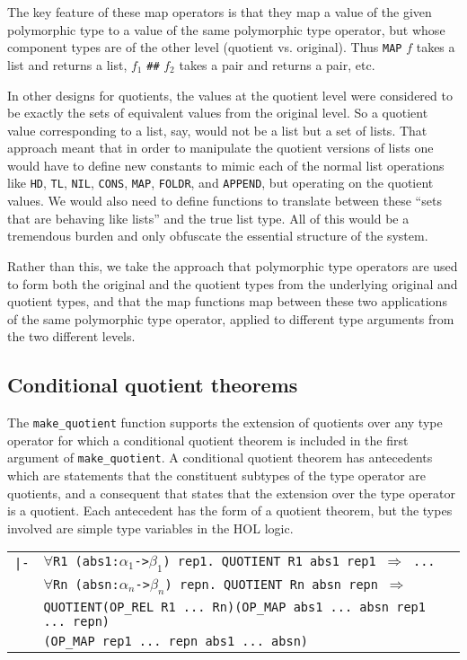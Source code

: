 \documentclass[envcountsame,runningheads]{llncs}
\begin{document}
The key feature of these map operators is that they map a value of the
given polymorphic type to a value of the same polymorphic type operator,
but whose component types are of the other level (quotient vs. original).
Thus {\tt MAP} $f$ takes a list and returns a list, $f_1$ {\tt \#\#} $f_2$
takes a pair and returns a pair, etc. 

In other designs for quotients, the values at the quotient level
were considered to be exactly the sets of equivalent values from
the original level.  So a quotient value corresponding to a list, say, 
would not be a list but a set of lists.  That approach meant that
in order to manipulate the quotient versions of lists one would have to
define new constants to mimic each of the normal list operations like
{\tt HD}, {\tt TL}, {\tt NIL}, {\tt CONS}, {\tt MAP}, {\tt FOLDR}, and {\tt APPEND},
but operating on the quotient values.
We would also need to define functions to translate between these
``sets that are behaving like lists'' and the true list type. 
All of this
would be a tremendous burden and only obfuscate the essential
structure of the system. 

Rather than this, we take the approach
that polymorphic type operators are used to form both the original and
the quotient types from the underlying original and quotient types,
and that the map functions map between these two applications of the
same polymorphic type operator, applied to different type arguments from the
two different levels.

%
\subsection{Conditional quotient theorems}
%
\label{condquotients}

The
{\tt make\_quotient}
function supports the extension of quotients
over any type operator for which a conditional quotient theorem is 
included in the first argument of {\tt make\_quotient}.
A conditional quotient theorem
has antecedents
which are statements
that the constituent subtypes
of the type operator are quotients, and a consequent that states that the 
extension over the type operator is a quotient.
Each antecedent has the form of a quotient theorem, but the types involved
are simple type variables in the HOL logic.
\begin{center}
\begin{tabular}{rl}
{\tt |-}
& {\tt $\forall$R1 (abs1:$\alpha_1$->$\beta_1$) rep1. QUOTIENT R1 abs1 rep1 $\Rightarrow$ ...} \\
& {\tt $\forall$Rn (absn:$\alpha_n$->$\beta_n$) repn. QUOTIENT Rn absn repn $\Rightarrow$} \\
& {\tt QUOTIENT\;(OP\_REL R1 ... Rn)\;(OP\_MAP abs1 ... absn rep1 ... repn)} \\
& \hfill {\tt (OP\_MAP rep1 ... repn abs1 ... absn)} \\
\end{tabular}
\end{center}
\end{document}
